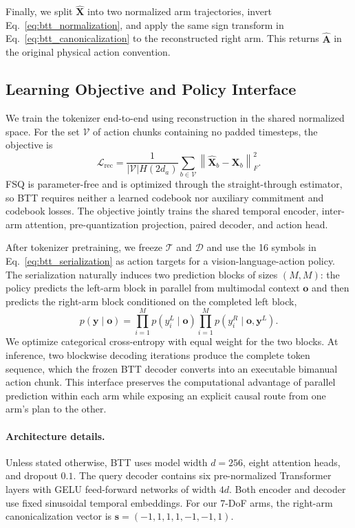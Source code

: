 Finally, we split $\widehat{\mathbf{X}}$ into two normalized arm trajectories,
invert Eq.~\eqref{eq:btt_normalization}, and apply the same sign transform in
Eq.~\eqref{eq:btt_canonicalization} to the reconstructed right arm.  This
returns $\widehat{\mathbf{A}}$ in the original physical action convention.

\subsection{Learning Objective and Policy Interface}
\label{sec:btt_training}

We train the tokenizer end-to-end using reconstruction in the shared normalized
space.  For the set $\mathcal{V}$ of action chunks containing no padded
timesteps, the objective is
\begin{equation}
    \mathcal{L}_{\mathrm{rec}}
    = \frac{1}{|\mathcal{V}|H(2d_a)}
      \sum_{b\in\mathcal{V}}
      \left\|
      \widehat{\mathbf{X}}_{b}-\mathbf{X}_{b}
      \right\|_{F}^{2}.
    \label{eq:btt_objective}
\end{equation}
FSQ is parameter-free and is optimized through the straight-through estimator,
so BTT requires neither a learned codebook nor auxiliary commitment and
codebook losses.  The objective jointly trains the shared temporal encoder,
inter-arm attention, pre-quantization projection, paired decoder, and action
head.

After tokenizer pretraining, we freeze $\mathcal{T}$ and $\mathcal{D}$ and use
the 16 symbols in Eq.~\eqref{eq:btt_serialization} as action targets for a
vision-language-action policy.  The serialization naturally induces two
prediction blocks of sizes $(M,M)$: the policy predicts the left-arm block in
parallel from multimodal context $\mathbf{o}$ and then predicts the right-arm
block conditioned on the completed left block,
\begin{equation}
    p(\mathbf{y}\mid\mathbf{o})
    = \prod_{i=1}^{M}p(y^{L}_{i}\mid\mathbf{o})
      \prod_{i=1}^{M}p(y^{R}_{i}\mid\mathbf{o},\mathbf{y}^{L}).
    \label{eq:btt_policy_factorization}
\end{equation}
We optimize categorical cross-entropy with equal weight for the two blocks.
At inference, two blockwise decoding iterations produce the complete token
sequence, which the frozen BTT decoder converts into an executable bimanual
action chunk.  This interface preserves the computational advantage of
parallel prediction within each arm while exposing an explicit causal route
from one arm's plan to the other.

\paragraph{Architecture details.}
Unless stated otherwise, BTT uses model width $d=256$, eight attention heads,
and dropout $0.1$.  The query decoder contains six pre-normalized Transformer
layers with GELU feed-forward networks of width $4d$.  Both encoder and decoder
use fixed sinusoidal temporal embeddings.  For our 7-DoF arms, the right-arm
canonicalization vector is
$\mathbf{s}=(-1,1,1,1,-1,-1,1)$.
